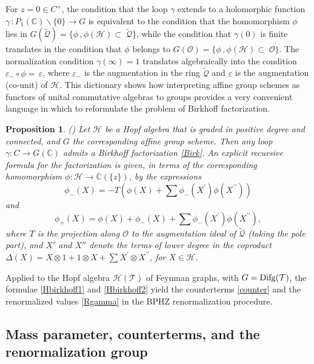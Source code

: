 \documentclass[10pt]{amsart}
\def\C{{\mathbb C}}
\def\Cb{{\mathbb C}}
\def\cH{{\mathcal H}}
\def\Hc{{\mathcal H}}
\renewcommand{\O}{{\mathcal O}}
\def\Qc{{\mathcal Q}}
\def\sT{{\mathcal T}}
\def\ve{\varepsilon}
\newtheorem{prop}[thm]{Proposition}
\numberwithin{equation}{section}
\begin{document}
\smallskip

For $z=0 \in C^+$, the
condition that the loop $\gamma$ extends to a holomorphic function
$\gamma\,:P_1 (\Cb)\backslash\{ 0 \}\to G$ is equivalent to the
condition that the homomorphism $\phi$ lies in $G(\tilde\Qc)=\{
\phi\,,\phi({\mathcal H})\subset\;\tilde\Qc \}$, while the condition
that $\gamma(0)$ is finite translates in the condition that
$\phi$ belongs to $G(\O)=\{ \phi\,, \phi({\mathcal
 H})\subset\;\O \}$. The
normalization condition $\gamma(\infty)=1$ translates
algebraically into the condition $\ve_-\circ \phi=\,\ve$, where
$\ve_-$ is the augmentation in the ring $\tilde\Qc$ and $\ve$ is
the augmentation (co-unit) of $\Hc$. This dictionary shows how
interpreting affine group schemes as functors of unital
commutative algebras to groups provides a very convenient language
in which to reformulate the problem of Birkhoff factorization.

\smallskip

\begin{prop}\label{BirkHopf} {\em (\cite{CK1})}
Let $\cH$ be a Hopf algebra that is graded in
positive degree and connected, and $G$ the corresponding affine group
scheme. Then any loop $\gamma: C \to G(\C)$ admits a Birkhoff
factorization \eqref{Birk}. An explicit recursive formula for the
factorization is given, in terms of the corresponding homomorphism
$\phi: \cH \to \C(\{ z \})$, by the expressions
\begin{equation}\label{Hbirkhoff1}
 \phi_-(X)=-T\left(\phi(X)+\sum\phi_-(X^\prime)
 \phi(X^{\prime\prime}) \right)
 \end{equation}
 and
 \begin{equation}\label{Hbirkhoff2}
 \phi_+(X)=\phi(X)+\phi_-(X)+\sum\phi_-(X^\prime)
 \phi(X^{\prime\prime}),
 \end{equation}
where $T$ is the projection along $\O$ to the augmentation
ideal of $\tilde\Qc$ (taking the pole part), and $X'$
and $X''$ denote the terms of lower
 degree in the coproduct
 $\Delta(X)= X \otimes 1 + 1 \otimes X + \sum X^\prime
 \otimes X^{\prime\prime}$,
 for $X \in{\mathcal H}$.
\end{prop}

Applied to the Hopf algebra $\cH(\sT)$ of Feynman graphs, with $G={\rm
Difg}(\sT)$, the formulae \eqref{Hbirkhoff1} and \eqref{Hbirkhoff2}
yield the counterterms \eqref{counter} and the renormalized values \eqref{Rgamma}
in the BPHZ renormalization procedure.


\medskip
\subsection*{Mass parameter, counterterms, and the
renormalization group}\label{MassSect}\hfill\medskip
\end{document}

